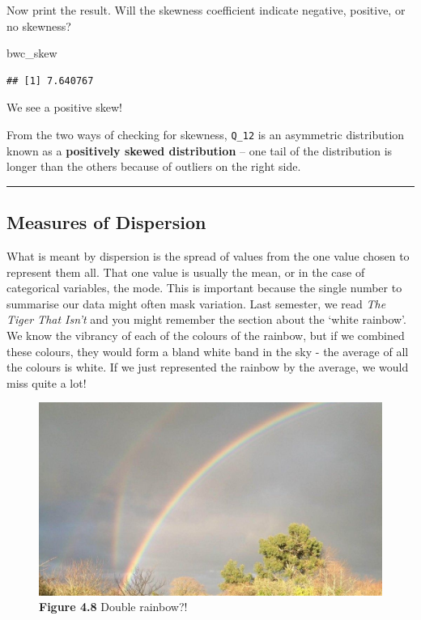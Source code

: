 \documentclass[
]{book}
\newenvironment{Shaded}{\begin{snugshade}}{\end{snugshade}}
\newcommand{\NormalTok}[1]{#1}
\begin{document}
Now print the result. Will the skewness coefficient indicate negative, positive, or no skewness?

\begin{Shaded}
\begin{Highlighting}[]
\NormalTok{bwc\_skew}
\end{Highlighting}
\end{Shaded}

\begin{verbatim}
## [1] 7.640767
\end{verbatim}

We see a positive skew!

From the two ways of checking for skewness, \texttt{Q\_12} is an asymmetric distribution known as a \textbf{positively skewed distribution} -- one tail of the distribution is longer than the others because of outliers on the right side.

\begin{center}\rule{0.5\linewidth}{0.5pt}\end{center}

\hypertarget{measures-of-dispersion}{%
\subsection{Measures of Dispersion}\label{measures-of-dispersion}}

What is meant by dispersion is the spread of values from the one value chosen to represent them all. That one value is usually the mean, or in the case of categorical variables, the mode. This is important because the single number to summarise our data might often mask variation. Last semester, we read \emph{The Tiger That Isn't} and you might remember the section about the `white rainbow'. We know the vibrancy of each of the colours of the rainbow, but if we combined these colours, they would form a bland white band in the sky - the average of all the colours is white. If we just represented the rainbow by the average, we would miss quite a lot!

\begin{figure}
\centering
\includegraphics{Images/rainbow.jpg}
\caption{\textbf{Figure 4.8} Double rainbow?!}
\end{figure}
\end{document}
